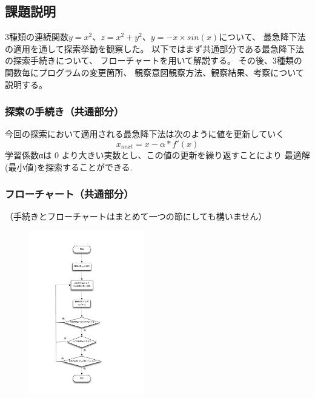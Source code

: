 \subsection{課題説明}
3種類の連続関数$y=x^2$、$z=x^2+y^2$、$y=-x \times sin(x)$について、
最急降下法の適用を通して探索挙動を観察した。
以下ではまず共通部分である最急降下法の探索手続きについて、
フローチャートを用いて解説する。
その後、3種類の関数毎にプログラムの変更箇所、
観察意図観察方法、観察結果、考察について説明する。

\subsubsection{探索の手続き（共通部分）}
今回の探索において適用される最急降下法は次のように値を更新していく
\[x_{next} = x -α*f'(x)\]
学習係数αは 0 より大きい実数とし、この値の更新を繰り返すことにより
最適解(最小値)を探索することができる.

\subsubsection{フローチャート（共通部分）}
（手続きとフローチャートはまとめて一つの節にしても構いません）
	\begin{figure}[h!]
  		\includegraphics[clip,width=5.0cm]{level2/flowchart.pdf}
	\end{figure}

